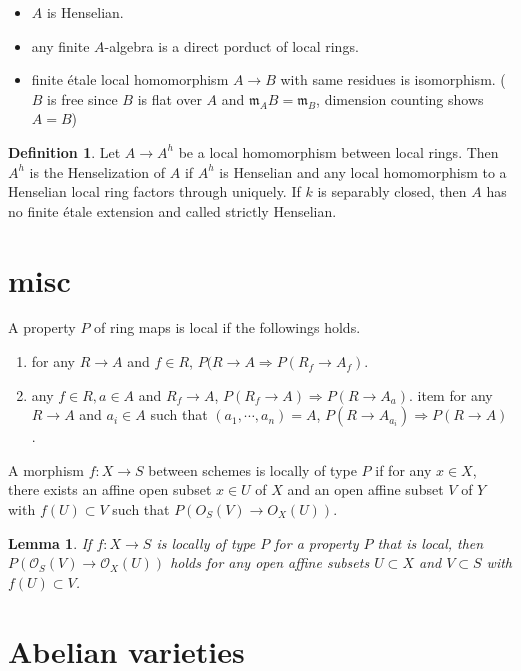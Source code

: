 \documentclass[leqno]{amsart}
\newcommand{\oo}{\mathcal O}
\newcommand{\1}{\mathbf{1}}
\newcommand{\fm}{\mathfrak m}
\newtheorem{lem}[thm]{Lemma}
\theoremstyle{definition}
\newtheorem{defn}[thm]{Definition}
\theoremstyle{remark}
\begin{document}
\begin{itemize}
	\item $A$ is Henselian.
	\item any finite  $A$-algebra 
		is a direct porduct of local rings.
	\item finite  \'{e}tale local homomorphism
		$A\to B$ with same residues 
		is isomorphism.
		($B$ is free since  $B$ is flat over  $A$
		and  $\fm_AB=\fm_B$, dimension counting
		shows  $A=B$)
\end{itemize}


\begin{defn}
	Let $A\to A^h$
	be a local homomorphism between local rings.
	Then $A^h$ is the Henselization of  $A$
	if  $A^h$ is Henselian and 
	any local homomorphism to a Henselian local ring
	factors through uniquely.
	If  $k$ is separably closed,
	then  $A$ has no finite  \'{e}tale extension 
	and called strictly Henselian.
\end{defn}



\section{misc}

A property $P$ of ring maps is local if 
the followings holds.
\begin{enumerate}[label=(\alph*)]
	 \item for  any $R\to A$ and  $f\in R$,
	 $P(R\to A \Longrightarrow P(R_f\to A_f)$.
	 \item    any  $f\in R, a\in A$ and  $R_f\to A$,
	 $P(R_f\to A)\Longrightarrow P(R\to A_a)$.
	 item for any  $R\to A$ and  $a_i\in A$ 
	 such that  $(a_1,\cdots,a_n)=A$,
		$P(R\to A_{a_i})\Longrightarrow P(R\to A)$.
\end{enumerate}
A morphism $f\colon X\to S$ between schemes 
is locally of type $P$ if for any  $x\in X$,
there exists an affine open subset  $x\in U$ of  $X$
and an open affine subset $V$ of $Y$ with  $f(U)\subset V$
such that $P(O_S(V)\to O_X(U))$.
\begin{lem}
	If $f\colon X\to S$ is locally of type  $P$
	for a property  $P$ that is local,
	then $P(\oo_S(V)\to \oo_X(U))$ holds
	for any open affine subsets 
	$U\subset X$ and  $V\subset S$
	with  $f(U)\subset V$.
\end{lem}


\section{Abelian varieties}
\end{document}
